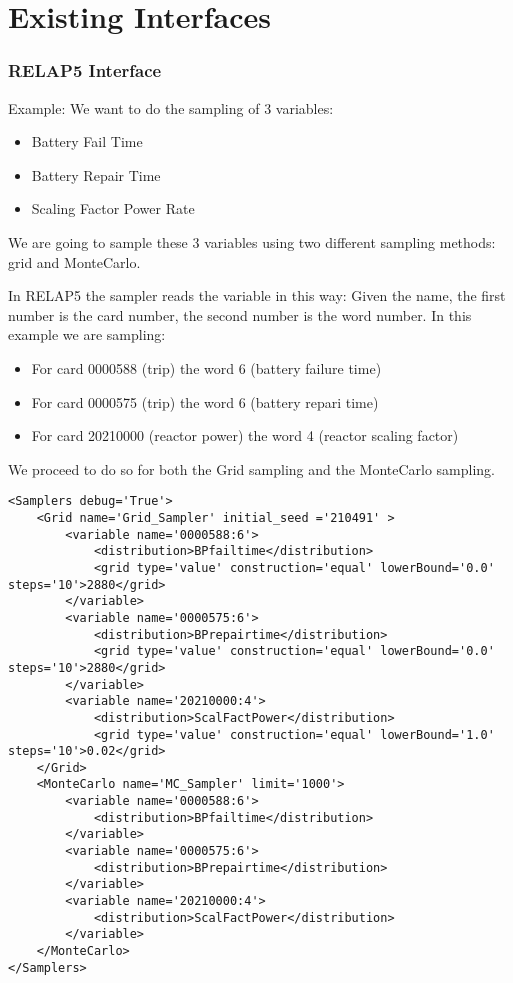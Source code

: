 \section{Existing Interfaces  \\ \vspace{2 mm} {\small }}

\subsubsection{RELAP5 Interface}

Example:
We want to do the sampling of 3 variables:
\begin{itemize}
\item Battery Fail Time
\item Battery Repair Time
\item Scaling Factor Power Rate
\end{itemize}
We are going to sample these 3 variables using two different sampling methods: grid and MonteCarlo.

In RELAP5 the sampler reads the variable in this way:
Given the name, the first number is the card number, the second number is the word number.
In this example we are sampling:
\begin{itemize}
\item For card 0000588 (trip) the word 6 (battery failure time)
\item For card 0000575 (trip) the word 6 (battery repari time)
\item For card 20210000 (reactor power) the word 4 (reactor scaling factor)
\end{itemize}

We proceed to do so for both the Grid sampling and the MonteCarlo sampling.

\begin{lstlisting}[style=XML]
<Samplers debug='True'>
    <Grid name='Grid_Sampler' initial_seed ='210491' >
        <variable name='0000588:6'>
            <distribution>BPfailtime</distribution>
            <grid type='value' construction='equal' lowerBound='0.0' steps='10'>2880</grid>
        </variable>
        <variable name='0000575:6'>
            <distribution>BPrepairtime</distribution>
            <grid type='value' construction='equal' lowerBound='0.0' steps='10'>2880</grid>
        </variable>
		<variable name='20210000:4'>
            <distribution>ScalFactPower</distribution>
            <grid type='value' construction='equal' lowerBound='1.0' steps='10'>0.02</grid>
	</Grid>
	<MonteCarlo name='MC_Sampler' limit='1000'>
		<variable name='0000588:6'>
            <distribution>BPfailtime</distribution>
		</variable>
		<variable name='0000575:6'>
            <distribution>BPrepairtime</distribution>
		</variable>
		<variable name='20210000:4'>
            <distribution>ScalFactPower</distribution>
		</variable>
	</MonteCarlo>
</Samplers>
\end{lstlisting}
